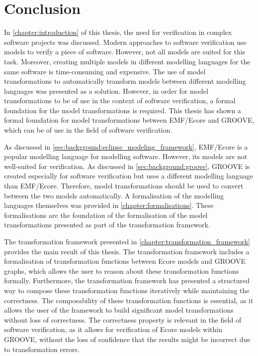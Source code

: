 \chapter{Conclusion}
\label{chapter:conclusion}

In \cref{chapter:introduction} of this thesis, the need for verification in complex software projects was discussed. Modern approaches to software verification use models to verify a piece of software. However, not all models are suited for this task. Moreover, creating multiple models in different modelling languages for the same software is time-consuming and expensive. The use of model transformations to automatically transform models between different modelling languages was presented as a solution. However, in order for model transformations to be of use in the context of software verification, a formal foundation for the model transformations is required. This thesis has shown a formal foundation for model transformations between EMF/Ecore and GROOVE, which can be of use in the field of software verification.

As discussed in \cref{sec:background:eclipse_modeling_framework}, EMF/Ecore is a popular modelling language for modelling software. However, its models are not well-suited for verification. As discussed in \cref{sec:background:groove}, GROOVE is created especially for software verification but uses a different modelling language than EMF/Ecore. Therefore, model transformations should be used to convert between the two models automatically. A formalisation of the modelling languages themselves was provided in \cref{chapter:formalisations}. These formalisations are the foundation of the formalisation of the model transformations presented as part of the transformation framework.

The transformation framework presented in \cref{chapter:transformation_framework} provides the main result of this thesis. The transformation framework includes a formalisation of transformation functions between Ecore models and GROOVE graphs, which allows the user to reason about these transformation functions formally. Furthermore, the transformation framework has presented a structured way to compose these transformation functions iteratively while maintaining the correctness. The composability of these transformation functions is essential, as it allows the user of the framework to build significant model transformations without loss of correctness. The correctness property is relevant in the field of software verification, as it allows for verification of Ecore models within GROOVE, without the loss of confidence that the results might be incorrect due to transformation errors.

